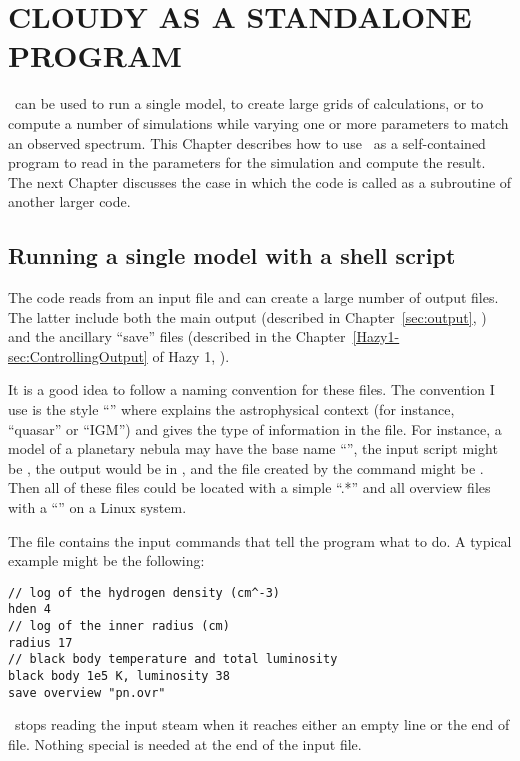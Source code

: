 \chapter{CLOUDY AS A STANDALONE PROGRAM}

\Cloudy\ can be used to run a single model, to create large grids of
calculations, or to compute a number of simulations while
varying one or more parameters to match an observed spectrum.
This Chapter describes how to use \Cloudy\ as a self-contained
program to read in the parameters for
the simulation and compute the result.
The next Chapter discusses the case in which the code is called
as a subroutine of another larger code.

\section{Running a single model with a shell script}

The code reads from an input file and can create a large number of
output files.  The latter include both the main output (described in
Chapter~\ref{sec:output}, ) and
the ancillary ``save'' files (described in the
Chapter~\ref{Hazy1-sec:ControllingOutput} of Hazy 1,
).

It is a good idea to follow a naming convention for these files.
The
convention I use is the style ``''
where  explains
the astrophysical context (for instance, ``quasar'' or ``IGM'')
and 
gives the type of information in the file.
For instance, a model of a
planetary nebula may have the base name ``'',
the input script might be
, the output would be in
, and the file created
by the  command might be
.
Then all of these files
could be located with a simple ``.*''
and all overview files with a
``'' on a Linux system.

The  file contains the input commands
that tell the program what
to do.
A typical example might be the following:
\begin{verbatim}
// log of the hydrogen density (cm^-3)
hden 4
// log of the inner radius (cm)
radius 17
// black body temperature and total luminosity
black body 1e5 K, luminosity 38
save overview "pn.ovr"
\end{verbatim}
\Cloudy\ stops reading the input steam when it reaches
either an empty line or the end of file.
Nothing special is needed at the end of the input file.

